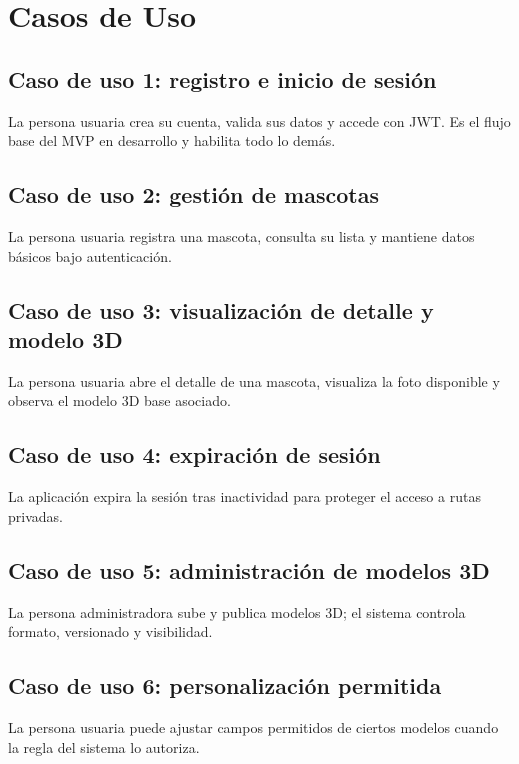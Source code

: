 \section{Casos de Uso}
\subsection{Caso de uso 1: registro e inicio de sesi\'on}
La persona usuaria crea su cuenta, valida sus datos y accede con JWT. Es el flujo base del MVP en desarrollo y habilita todo lo dem\'as.

\subsection{Caso de uso 2: gesti\'on de mascotas}
La persona usuaria registra una mascota, consulta su lista y mantiene datos b\'asicos bajo autenticaci\'on.

\subsection{Caso de uso 3: visualizaci\'on de detalle y modelo 3D}
La persona usuaria abre el detalle de una mascota, visualiza la foto disponible y observa el modelo 3D base asociado.

\subsection{Caso de uso 4: expiraci\'on de sesi\'on}
La aplicaci\'on expira la sesi\'on tras inactividad para proteger el acceso a rutas privadas.

\subsection{Caso de uso 5: administraci\'on de modelos 3D}
La persona administradora sube y publica modelos 3D; el sistema controla formato, versionado y visibilidad.

\subsection{Caso de uso 6: personalizaci\'on permitida}
La persona usuaria puede ajustar campos permitidos de ciertos modelos cuando la regla del sistema lo autoriza.
